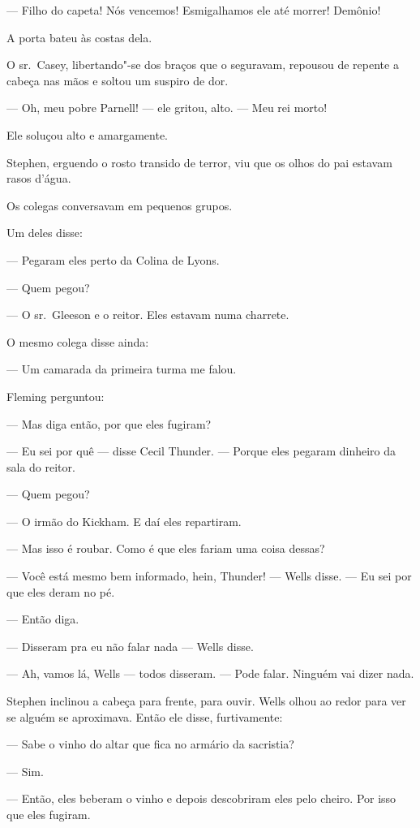  --- Filho do capeta! Nós vencemos! Esmigalhamos ele até morrer! Demônio!

A porta bateu às costas dela.

O sr.~Casey, libertando"-se dos braços que o seguravam, repousou de
repente a cabeça nas mãos e soltou um suspiro de dor.

 --- Oh, meu pobre Parnell! --- ele gritou, alto. --- Meu rei morto!

Ele soluçou alto e amargamente.

Stephen, erguendo o rosto transido de terror, viu que os olhos do pai
estavam rasos d’água.

\medskip
\asterisc
\medskip

Os colegas conversavam em pequenos grupos.

Um deles disse:

 --- Pegaram eles perto da Colina de Lyons.

 --- Quem pegou?

 --- O sr.~Gleeson e o reitor. Eles estavam numa charrete. 
 
O mesmo colega disse ainda:

 --- Um camarada da primeira turma me falou.

Fleming perguntou:

 --- Mas diga então, por que eles fugiram?

 --- Eu sei por quê --- disse Cecil Thunder. --- Porque eles pegaram dinheiro da sala do reitor.

 --- Quem pegou?

 --- O irmão do Kickham. E daí eles repartiram.

 --- Mas isso é roubar. Como é que eles fariam uma coisa dessas?

 --- Você está mesmo bem informado, hein, Thunder! --- Wells disse. --- Eu sei por que eles deram no pé.

 --- Então diga.

 --- Disseram pra eu não falar nada --- Wells disse.

 --- Ah, vamos lá, Wells --- todos disseram. --- Pode falar. Ninguém vai dizer nada.

Stephen inclinou a cabeça para frente, para ouvir. Wells olhou ao redor
para ver se alguém se aproximava. Então ele disse, furtivamente:

 --- Sabe o vinho do altar que fica no armário da sacristia?

 --- Sim.

 --- Então, eles beberam o vinho e depois descobriram eles pelo cheiro. Por isso que eles fugiram.

